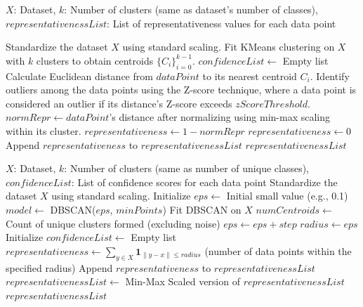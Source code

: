 \documentclass[10pt,a4paper,oneside]{article}
\begin{document}
\begin{algorithm}
\caption{Estimation of Representativeness using KMeans Clustering}
\label{alg:representativeness_kmeans}
\begin{algorithmic}[1]
\Require $X$: Dataset, $k$: Number of clusters (same as dataset's number of classes), 
\Ensure $representativenessList$: List of representativeness values for each data point

\State Standardize the dataset $X$ using standard scaling.
\State Fit KMeans clustering on $X$ with $k$ clusters to obtain centroids $\{C_i\}_{i=0}^{k-1}$.
\State $confidenceList \gets$ Empty list
    \State Calculate Euclidean distance from $dataPoint$ to its nearest centroid $C_i$.
\EndFor
\State Identify outliers among the data points using the Z-score technique, where a data point is considered an outlier if its distance's Z-score exceeds $zScoreThreshold$.
        \State $normRepr \gets dataPoint$'s distance after normalizing using min-max scaling within its cluster.
        \State $representativeness \gets 1 - normRepr$
    \Else
        \State $representativeness \gets 0$
    \State Append $representativeness$ to $representativenessList$
    \EndIf
\EndFor
\State \Return $representativenessList$
\EndFunction
\end{algorithmic}
\end{algorithm}


\begin{algorithm}
\caption{Estimation of Representativeness using Density Based Approach}
\label{alg:representativeness_DBSCAN}
\begin{algorithmic}[1]
\Require $X$: Dataset, $k$: Number of clusters (same as number of unique classes), \Ensure $confidenceList$: List of confidence scores for each data point
\State Standardize the dataset $X$ using standard scaling.
\State Initialize $eps \gets$ Initial small value (e.g., 0.1)
    \State $model \gets$ DBSCAN($eps$, $minPoints$)
    \State Fit DBSCAN on $X$
    \State $numCentroids \gets$ Count of unique clusters formed (excluding noise)
    \State $eps \gets eps + step$
\EndWhile
\State $radius \gets eps$
\State Initialize $confidenceList \gets$ Empty list
    \State $representativeness \gets \sum\limits_{y \in X} \mathbf{1}_{\|y - x\| \leq radius}$ (number of data points within the specified radius)
    \State Append $representativeness$ to $representativenessList$
\EndFor
\State $representativenessList \gets$ Min-Max Scaled version of $representativenessList$ 
\State \Return $representativenessList$
\EndFunction
\end{algorithmic}
\end{algorithm}
\end{document}

